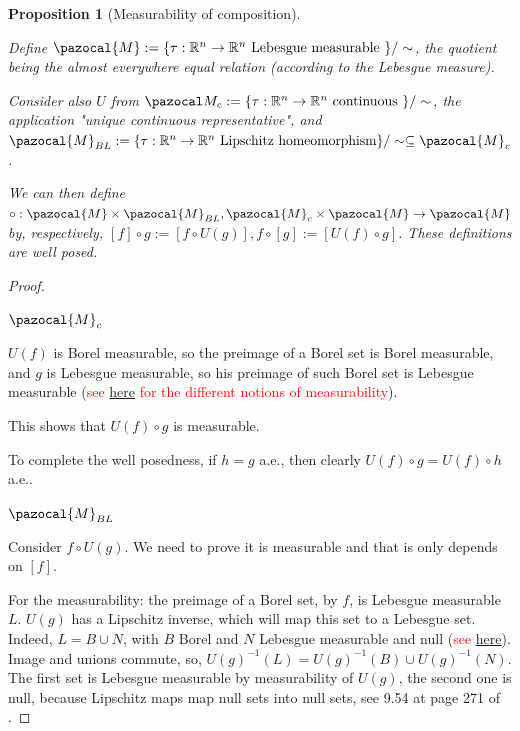 \documentclass[english,a4paper,12pt,oneside]{scrbook}
\theoremstyle{break}
\newtheorem{prop}[equation]{Proposition}
\newenvironment{mproof}[1][\proofname]{%
  \begin{proof}[#1]$ $\par\nobreak\ignorespaces
}{%
  \end{proof}
}
\renewcommand*{\proofname}{Proof}
\theoremstyle{remark}
\newcommand{\mR}{\mathbb{R}}
\newcommand{\cT}{\pazocal{T}}
\begin{document}
\begin{prop}[Measurability of composition]
\label{prop:circ_wd}

Define $\pazocal{M}:=\{\tau: \mR^n \rightarrow \mR^n \text{ Lebesgue measurable } \}/\sim$, the quotient being the almost everywhere equal relation (according to the Lebesgue measure).

Consider also $U$ from $\pazocal M_c :=\{\tau: \mR^n \rightarrow \mR^n \text{ continuous } \}/\sim$, the application "unique continuous representative", and $\pazocal{M}_{BL} :=\{\tau: \mR^n \rightarrow \mR^n \text{ Lipschitz homeomorphism} \}/\sim \subseteq \pazocal{M}_c$.

We can then define $\circ:  \pazocal{M} \times \pazocal{M}_{BL}, \pazocal{M}_c \times \pazocal{M} \rightarrow \pazocal{M}$ by, respectively, $[f]\circ g := [f\circ U(g)], f \circ [g]:= [U(f)\circ g]$. These definitions are well posed.

\end{prop}
\begin{mproof}

\underline{$\pazocal{M}_c$}

$U(f)$ is Borel measurable, so the preimage of a Borel set is Borel measurable, and $g$ is Lebesgue measurable, so his preimage of such Borel set is Lebesgue measurable (\textcolor{red}{see \href{https://math.stackexchange.com/questions/283443/is-composition-of-measurable-functions-measurable}{here} for the different notions of measurability}).

This shows that $U(f)\circ g$ is measurable.

To complete the well posedness, if $h=g$ a.e., then clearly $U(f)\circ g= U(f)\circ  h$ a.e..

\underline{$\pazocal{M}_{BL}$}

Consider $f\circ U(g)$. We need to prove it is measurable and that is only depends on $[f]$.

For the measurability: the preimage of a Borel set, by $f$, is Lebesgue measurable $L$. $U(g)$ has a Lipschitz inverse, which will map this set to a Lebesgue set. Indeed, $L = B \cup N$, with $B$ Borel and $N$ Lebesgue measurable and null (\textcolor{red}{see \href{https://math.stackexchange.com/questions/3420145/lebesgue-measurable-set-union-of-borel-set-and-null-set}{here}}). Image and unions commute, so, $U(g)^{-1}(L) = U(g)^{-1}(B) \cup U(g)^{-1}(N)$. The first set is Lebesgue measurable by measurability of $U(g)$, the second one is null, because Lipschitz maps map null sets into null sets, see 9.54 at page 271 of \cite{leoni}. 


\end{mproof}
\end{document}
